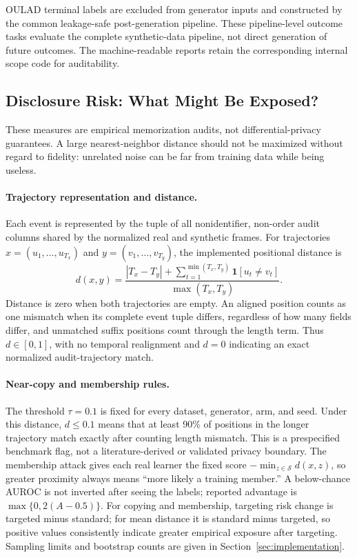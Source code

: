 \documentclass[10pt]{article}
\newcommand{\SYN}{\mathcal{S}}
\begin{document}
OULAD terminal labels are excluded from generator inputs and constructed by the
common leakage-safe post-generation pipeline. These pipeline-level outcome tasks
evaluate the complete synthetic-data pipeline, not direct generation of future
outcomes. The machine-readable reports retain the corresponding internal scope
code for auditability.

\subsection{Disclosure Risk: What Might Be Exposed?}

These measures are empirical memorization audits, not differential-privacy
guarantees.  A large nearest-neighbor distance should not be maximized without
regard to fidelity: unrelated noise can be far from training data while being
useless.

\paragraph{Trajectory representation and distance.}
Each event is represented by the tuple of all nonidentifier, non-order audit
columns shared by the normalized real and synthetic frames. For trajectories
$x=(u_1,\ldots,u_{T_x})$ and $y=(v_1,\ldots,v_{T_y})$, the implemented
positional distance is
\[
d(x,y)=\frac{|T_x-T_y|+
\sum_{t=1}^{\min(T_x,T_y)}\mathbf{1}[u_t\ne v_t]}
{\max(T_x,T_y)}.
\]
Distance is zero when both trajectories are empty. An aligned position counts
as one mismatch when its complete event tuple differs, regardless of how many
fields differ, and unmatched suffix positions count through the length term.
Thus $d\in[0,1]$, with no temporal realignment and $d=0$ indicating an exact
normalized audit-trajectory match.

\paragraph{Near-copy and membership rules.}
The threshold \(\tau=0.1\) is fixed for every dataset, generator, arm, and seed.
Under this distance, $d\leq0.1$ means that at least 90\% of positions in the
longer trajectory match exactly after counting length mismatch. This is a
prespecified benchmark flag, not a literature-derived or validated privacy
boundary. The membership attack gives each real learner the fixed score
$-\min_{z\in\SYN}d(x,z)$, so greater proximity always means ``more likely a
training member.'' A below-chance AUROC is not inverted after seeing the labels;
reported advantage is \(\max\{0,2(A-0.5)\}\). For copying and membership,
targeting risk change is targeted minus standard; for mean distance it is
standard minus targeted, so positive values consistently indicate greater
empirical exposure after targeting. Sampling limits and bootstrap counts are
given in Section~\ref{sec:implementation}.
\end{document}
